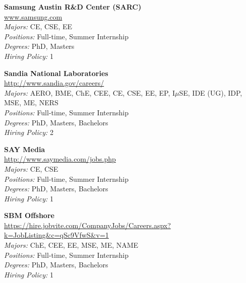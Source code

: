\documentclass{article}
\begin{document}
\begin{center}
\begin{multicols}{3}
\begin{minipage}{.9\columnwidth}{\Large\bf Samsung Austin R\&D Center (SARC) }\\
	\url{www.samsung.com}\\
	\emph{Majors:} CE, CSE, EE\\
	\emph{Positions:} Full-time, Summer Internship\\
	\emph{Degrees:} PhD, Masters\\
	\emph{Hiring Policy:} 1\\
\end{minipage}
 
\begin{minipage}{.9\columnwidth}{\Large\bf Sandia National Laboratories }\\
	\url{http://www.sandia.gov/careers/}\\
	\emph{Majors:} AERO, BME, ChE, CEE, CE, CSE, EE, EP, I$\mu$SE, IDE (UG), IDP, MSE, ME, NERS\\
	\emph{Positions:} Full-time, Summer Internship\\
	\emph{Degrees:} PhD, Masters, Bachelors\\
	\emph{Hiring Policy:} 2\\
\end{minipage}
 
\begin{minipage}{.9\columnwidth}{\Large\bf SAY Media }\\
	\url{http://www.saymedia.com/jobs.php}\\
	\emph{Majors:} CE, CSE\\
	\emph{Positions:} Full-time, Summer Internship\\
	\emph{Degrees:} PhD, Masters, Bachelors\\
	\emph{Hiring Policy:} 1\\
\end{minipage}
 
\begin{minipage}{.9\columnwidth}{\Large\bf SBM Offshore }\\
	\url{https://hire.jobvite.com/CompanyJobs/Careers.aspx?k=JobListing&c=qSc9VfwS&v=1}\\
	\emph{Majors:} ChE, CEE, EE, MSE, ME, NAME\\
	\emph{Positions:} Full-time, Summer Internship\\
	\emph{Degrees:} PhD, Masters, Bachelors\\
	\emph{Hiring Policy:} 1\\
\end{minipage}
 

\end{multicols}
\end{center}
\end{document}
